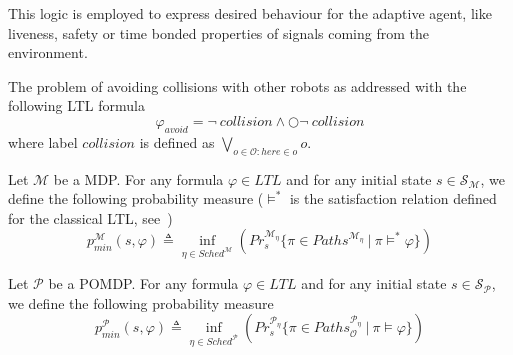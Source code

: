 This logic is employed to express desired behaviour for the adaptive agent, like liveness, safety or time bonded properties of signals coming from the environment.

\begin{example}\label{ex:formula}
The problem of avoiding collisions with other robots as addressed with the following \ac{LTL} formula
$$ \varphi_{avoid} = \neg\ collision \wedge \bigcirc \neg\ collision $$
where label $collision$ is defined as $\bigvee_{o \in \mathcal{O} : here \in o}o$.
\end{example}

Let $\mathcal{M}$ be a \ac{MDP}. For any formula $\varphi \in LTL$ and for any initial state $s \in \mathcal{S}_\mathcal{M}$, we define the following probability measure ($\models^*$ is the satisfaction relation defined for the classical \ac{LTL}, see~\cite[Definition 5.7]{Katoen-Baier})
\begin{equation}\label{eq:pmin_mdp}
p_{min}^\mathcal{M}(s,\varphi) \triangleq \inf_{\eta \in Sched^\mathcal{M}} \left(Pr_s^{\mathcal{M}_\eta}\{\pi \in Paths^{\mathcal{M}_\eta}\ |\ \pi \models^* \varphi \}\right)	
\end{equation}

Let $\mathcal{P}$ be a \ac{POMDP}. For any formula $\varphi \in LTL$ and for any initial state $s \in \mathcal{S}_\mathcal{P}$, we define the following probability measure
\begin{equation}\label{eq:pmin}
p_{min}^\mathcal{P}(s,\varphi) \triangleq \inf_{\eta \in Sched^\mathcal{P}} \left(Pr_s^{\mathcal{P}_\eta}\{\pi \in Paths_\mathcal{O}^{\mathcal{P}_\eta}\ |\ \pi \models \varphi \}\right)	
\end{equation}


